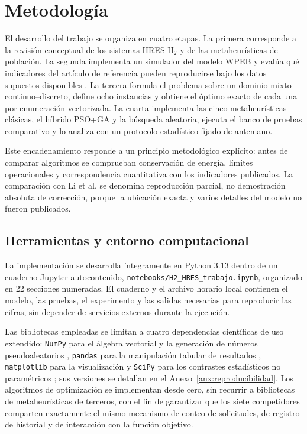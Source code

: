 \chapter{Metodología}

El desarrollo del trabajo se organiza en cuatro etapas. La primera corresponde a la revisión conceptual de los sistemas HRES-H$_2$ y de las metaheurísticas de población. La segunda implementa un simulador del modelo WPEB y evalúa qué indicadores del artículo de referencia pueden reproducirse bajo los datos supuestos disponibles \cite{Li2024WPEB}. La tercera formula el problema sobre un dominio mixto continuo--discreto, define ocho instancias y obtiene el óptimo exacto de cada una por enumeración vectorizada. La cuarta implementa las cinco metaheurísticas clásicas, el híbrido PSO+GA y la búsqueda aleatoria, ejecuta el banco de pruebas comparativo y lo analiza con un protocolo estadístico fijado de antemano.

Este encadenamiento responde a un principio metodológico explícito: antes de comparar algoritmos se comprueban conservación de energía, límites operacionales y correspondencia cuantitativa con los indicadores publicados. La comparación con Li et al. se denomina reproducción parcial, no demostración absoluta de corrección, porque la ubicación exacta y varios detalles del modelo no fueron publicados.

\section{Herramientas y entorno computacional}

La implementación se desarrolla íntegramente en Python 3.13 dentro de un cuaderno Jupyter autocontenido, \texttt{notebooks/H2\_HRES\_trabajo.ipynb}, organizado en 22 secciones numeradas. El cuaderno y el archivo horario local contienen el modelo, las pruebas, el experimento y las salidas necesarias para reproducir las cifras, sin depender de servicios externos durante la ejecución.

Las bibliotecas empleadas se limitan a cuatro dependencias científicas de uso extendido: \texttt{NumPy} para el álgebra vectorial y la generación de números pseudoaleatorios \cite{Harris2020NumPy}, \texttt{pandas} para la manipulación tabular de resultados \cite{McKinney2010Pandas}, \texttt{matplotlib} para la visualización \cite{Hunter2007Matplotlib} y \texttt{SciPy} para los contrastes estadísticos no paramétricos \cite{Virtanen2020SciPy}; sus versiones se detallan en el Anexo~\ref{anx:reproducibilidad}. Los algoritmos de optimización se implementan desde cero, sin recurrir a bibliotecas de metaheurísticas de terceros, con el fin de garantizar que los siete competidores comparten exactamente el mismo mecanismo de conteo de solicitudes, de registro de historial y de interacción con la función objetivo.

